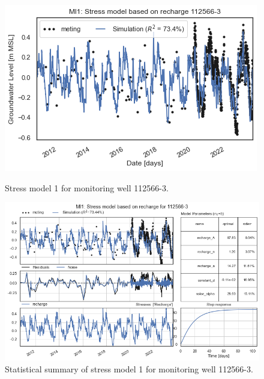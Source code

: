 \begin{figure}[htbp]
    \centering
    \begin{minipage}{0.32\textwidth}
        \centering
        \includegraphics[width=\linewidth]{figures/results/ml1 112566-3.png}
        \caption{Stress model 1 for monitoring well 112566-3.}
        \label{fig:112565-3}
    \end{minipage}
    \hfill
    \begin{minipage}{0.32\textwidth}
        \centering
        \includegraphics[width=\linewidth]{figures/results/ml1 112566-3 (2).png}
        \caption{Statistical summary of stress model 1 for monitoring well 112566-3.}
        \label{fig:112565-3}
    \end{minipage}
    \hfill
    \begin{minipage}{0.32\textwidth}
        \centering

\end{minipage}
\end{figure}
